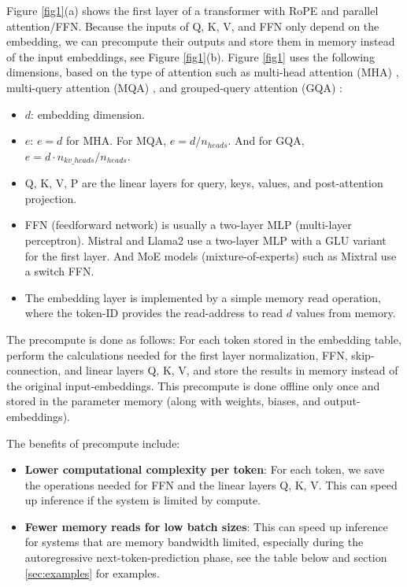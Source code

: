 \documentclass{article}
\begin{document}
Figure \ref{fig1}(a) shows the first layer of a transformer with RoPE and parallel attention/FFN. Because the inputs of Q, K, V, and FFN only depend on the embedding, we can precompute their outputs and store them in memory instead of the input embeddings, see Figure \ref{fig1}(b). Figure \ref{fig1} uses the following dimensions, based on the type of attention such as multi-head attention (MHA) \citep{vanilla}, multi-query attention (MQA) \citep{MQA}, and grouped-query attention (GQA) \citep{GQA}:

\begin{itemize}[topsep=-1pt, itemsep=-1pt]
  \item $d$: embedding dimension.
  \item $e$: $e = d$ for MHA. For MQA, $e = d / n_{heads}$. And for GQA, $e = d \cdot n_{kv\_heads} / n_{heads}$.
  \item Q, K, V, P are the linear layers for query, keys, values, and post-attention projection.
  \item FFN (feedforward network) is usually a two-layer MLP (multi-layer perceptron). Mistral and Llama2 use a two-layer MLP with a GLU variant \citep{GLU} for the first layer. And MoE models (mixture-of-experts) \citep{MoE} such as Mixtral use a switch FFN.
  \item The embedding layer is implemented by a simple memory read operation, where the token-ID provides the read-address to read $d$ values from memory.
\end{itemize}

The precompute is done as follows: For each token stored in the embedding table, perform the calculations needed for the first layer normalization, FFN, skip-connection, and linear layers Q, K, V, and store the results in memory instead of the original input-embeddings. This precompute is done offline only once and stored in the parameter memory (along with weights, biases, and output-embeddings).

The benefits of precompute include:
\begin{itemize}[topsep=-1pt, itemsep=-1pt]
  \item \textbf{Lower computational complexity per token}: For each token, we save the operations needed for FFN and the linear layers Q, K, V. This can speed up inference if the system is limited by compute.
  \item \textbf{Fewer memory reads for low batch sizes}: This can speed up inference for systems that are memory bandwidth limited, especially during the autoregressive next-token-prediction phase, see the table below and section \ref{sec:examples} for examples.
\end{itemize}
\end{document}
